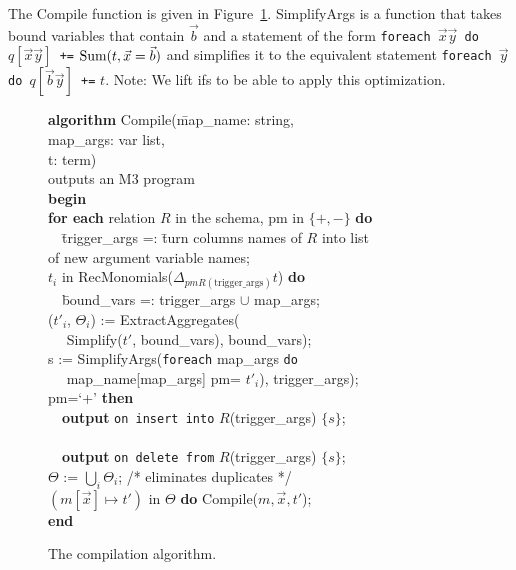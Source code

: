 The Compile function is given in Figure~\ref{fig:compilation-algo}. 
SimplifyArgs is a function that takes bound variables that contain
$\vec{b}$ and a statement of the form
{\tt foreach $\vec{x}\vec{y}$ do $q[\vec{x}\vec{y}]$ +=}
$\mbox{Sum}(t, \vec{x}=\vec{b})$
and simplifies it to the equivalent statement
{\tt foreach $\vec{y}$ do $q[\vec{b}\vec{y}]$ +=} $t$.
Note: We lift ifs to be able to apply this optimization.



\begin{figure}
\begin{tabbing}
{\bf algorithm} Compile(\=map\_name: string, \\
                  \>map\_args: var list, \\
                  \>t: term) \\
outputs an M3 program \\
{\bf begin} \\
{\bf for each} relation $R$ in the schema,
               pm in $\{+,-\}$ {\bf do} \\
~~\=
  trigger\_args =: \=turn columns names of $R$ into list \\
\>               \>of new argument variable names; \\
 $t_i$ in
        RecMonomials($\Delta_{pm R(\mathrm{trigger\_args})} t$) {\bf do} \\
\>~~\=bound\_vars =: trigger\_args $\cup$ map\_args; \\
\>\>($t'_i$, $\Theta_i$) := ExtractAggregates( \\
\>\>~~      Simplify($t'$, bound\_vars), bound\_vars); \\
\>\>s := SimplifyArgs({\tt foreach} map\_args {\tt do} \\
\>\>~~       map\_name[map\_args] pm= $t'_i$), trigger\_args); \\[1ex]
\> pm=`+' {\bf then} \\
\>\>~~{\bf output} {\tt on insert into} $R$(trigger\_args) $\{s\}$; \\
\> \\
\>\>~~{\bf output} {\tt on delete from} $R$(trigger\_args) $\{s\}$; \\[1ex]
\>$\Theta$ := $\bigcup_i \Theta_i$; /* eliminates duplicates */ \\
 $(m[\vec{x}] \mapsto t')$ in $\Theta$ {\bf do}
                 Compile($m, \vec{x}, t'$); \\
{\bf end}
\end{tabbing}

\vspace{-6mm}

\caption{The compilation algorithm.}
\label{fig:compilation-algo}
\end{figure}


